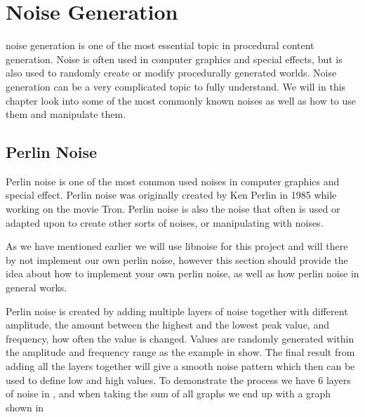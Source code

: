 \chapter{Noise Generation}
\label{NoiseGen}
noise generation is one of the most essential topic in procedural content generation. Noise is often used in computer graphics and special effects, but is also used to randomly create or modify procedurally generated worlds. Noise generation can be a very complicated topic to fully understand. We will in this chapter look into some of the most commonly known noises as well as how to use them and manipulate them.


\section{Perlin Noise}

Perlin noise is one of the most common used noises in computer graphics and special effect. Perlin noise was originally created by Ken Perlin\cite{KenPerlin} in 1985 while working on the movie Tron\cite{perlinnoise}. Perlin noise is also the noise that often is used or adapted upon to create other sorts of noises, or manipulating with noises.

As we have mentioned earlier we will use libnoise for this project and will there by not implement our own perlin noise, however this section should provide the idea about how to implement your own perlin noise, as well as how perlin noise in general works.

Perlin noise is created by adding multiple layers of noise together with different amplitude, the amount between the highest and the lowest peak value, and frequency, how often the value is changed\cite{perlinnoise2}. Values are randomly generated within the amplitude and frequency range as the example in  show. The final result from adding all the layers together will give a smooth noise pattern which then can be used to define low and high values. To demonstrate the process we have 6 layers of noise in , and when taking the sum of all graphs we end up with a graph shown in 

